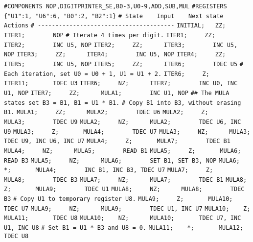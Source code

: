 \begin{apgsembly}
	\centering
	\begin{minipage}[t]{.49\textwidth}
		\begin{algorithmic}\tiny
			\State \verb|#COMPONENTS NOP,DIGITPRINTER_SE,B0-3,U0-9,ADD,SUB,MUL|
			\State \verb|#REGISTERS {"U1":1, "U6":6, "B0":2, "B2":1}|
			\State \verb|# State    Input    Next state    Actions|
			\State \verb|# ---------------------------------------|
			\State \verb|INITIAL;   ZZ;      ITER1;        NOP|
			\State \verb||
			\State \verb|# Iterate 4 times per digit.|
			\State \verb|ITER1;     ZZ;      ITER2;        INC U5, NOP|
			\State \verb|ITER2;     ZZ;      ITER3;        INC U5, NOP|
			\State \verb|ITER3;     ZZ;      ITER4;        INC U5, NOP|
			\State \verb|ITER4;     ZZ;      ITER5;        INC U5, NOP|
			\State \verb|ITER5;     ZZ;      ITER6;        TDEC U5|
			\State \verb||
			\State \verb|# Each iteration, set U0 = U0 + 1, U1 = U1 + 2.|
			\State \verb|ITER6;     Z;       ITER11;       TDEC U3|
			\State \verb|ITER6;     NZ;      ITER7;        INC U0, INC U1, NOP|
			\State \verb|ITER7;     ZZ;      MULA1;        INC U1, NOP|
			\State \verb||
			\State \verb|## The MULA states set B3 = B1, B1 = U1 * B1.|
			\State \verb|# Copy B1 into B3, without erasing B1.|
			\State \verb|MULA1;     ZZ;      MULA2;        TDEC U6|
			\State \verb|MULA2;     Z;       MULA3;        TDEC U9|
			\State \verb|MULA2;     NZ;      MULA2;        TDEC U6, INC U9|
			\State \verb|MULA3;     Z;       MULA4;        TDEC U7|
			\State \verb|MULA3;     NZ;      MULA3;        TDEC U9, INC U6, INC U7|
			\State \verb|MULA4;     Z;       MULA7;        TDEC B1|
			\State \verb|MULA4;     NZ;      MULA5;        READ B1|
			\State \verb|MULA5;     Z;       MULA6;        READ B3|
			\State \verb|MULA5;     NZ;      MULA6;        SET B1, SET B3, NOP|
			\State \verb|MULA6;     *;       MULA4;        INC B1, INC B3, TDEC U7|
			\State \verb|MULA7;     Z;       MULA8;        TDEC B3|
			\State \verb|MULA7;     NZ;      MULA7;        TDEC B1|
			\State \verb|MULA8;     Z;       MULA9;        TDEC U1|
			\State \verb|MULA8;     NZ;      MULA8;        TDEC B3|
			\State \verb||
			\State \verb|# Copy U1 to temporary register U8.|
			\State \verb|MULA9;     Z;       MULA10;       TDEC U7|
			\State \verb|MULA9;     NZ;      MULA9;        TDEC U1, INC U7|
			\State \verb|MULA10;    Z;       MULA11;       TDEC U8|
			\State \verb|MULA10;    NZ;      MULA10;       TDEC U7, INC U1, INC U8|
			\State \verb||
			\State \verb|# Set B1 = U1 * B3 and U8 = 0.|
			\State \verb|MULA11;    *;       MULA12;       TDEC U8|

\end{algorithmic}
\end{minipage}
\end{apgsembly}
